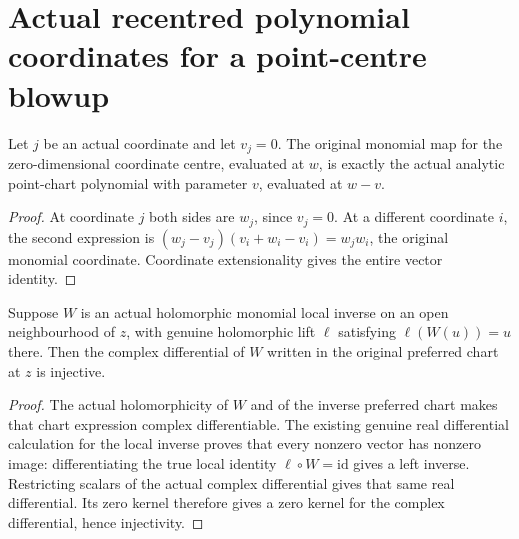 \section{Actual recentred polynomial coordinates for a point-centre blowup}

\begin{lemma}
\label{hir:actual-point-monomial-recentring}
\leanok
Let $j$ be an actual coordinate and let $v_j=0$. The original monomial
map for the zero-dimensional coordinate centre, evaluated at $w$, is
exactly the actual analytic point-chart polynomial with parameter $v$,
evaluated at $w-v$.
\end{lemma}
\begin{proof}
At coordinate $j$ both sides are $w_j$, since $v_j=0$.
At a different coordinate $i$, the second expression is
$(w_j-v_j)(v_i+w_i-v_i)=w_jw_i$, the original monomial coordinate.
Coordinate extensionality gives the entire vector identity.
\end{proof}

\begin{lemma}
\label{hir:actual-monomial-local-inverse-complex-injective}
\leanok
Suppose $W$ is an actual holomorphic monomial local inverse on an open
neighbourhood of $z$, with genuine holomorphic lift $\ell$ satisfying
$\ell(W(u))=u$ there. Then the complex differential of $W$ written in
the original preferred chart at $z$ is injective.
\end{lemma}
\begin{proof}
The actual holomorphicity of $W$ and of the inverse preferred chart makes
that chart expression complex differentiable. The existing genuine
real differential calculation for the local inverse proves that every
nonzero vector has nonzero image: differentiating the true local
identity $\ell\circ W=\mathrm{id}$ gives a left inverse. Restricting
scalars of the actual complex differential gives that same real
differential. Its zero kernel therefore gives a zero kernel for the
complex differential, hence injectivity.
\end{proof}

